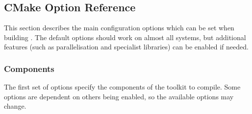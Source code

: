 \lstset{showstringspaces=true}

\subsection{CMake Option Reference}
\label{s:installation:source:cmake}
This section describes the main configuration options which can be set when
building \nekpp. The default options should work on almost all systems, but
additional features (such as parallelisation and specialist libraries) can be
enabled if needed.

\subsubsection{Components}
The first set of options specify the components of the \nekpp toolkit to
compile. Some options are dependent on others being enabled, so the available
options may change.

